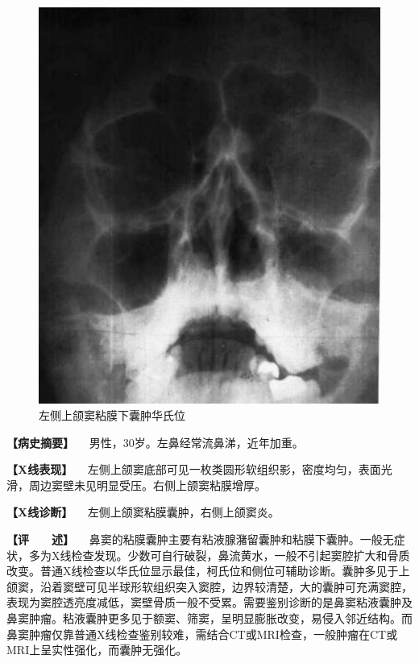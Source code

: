 \begin{figure}[!htbp]
 \centering
 \includegraphics{./images/Image00431.jpg}
 \captionsetup{justification=centering}
 \caption{左侧上颌窦粘膜下囊肿华氏位}
 \label{fig7-4-5}
  \end{figure} 

\textbf{【病史摘要】} 　男性，30岁。左鼻经常流鼻涕，近年加重。

\textbf{【X线表现】}
　左侧上颌窦底部可见一枚类圆形软组织影，密度均匀，表面光滑，周边窦壁未见明显受压。右侧上颌窦粘膜增厚。

\textbf{【X线诊断】} 　左侧上颌窦粘膜囊肿，右侧上颌窦炎。

\textbf{【评　　述】}
　鼻窦的粘膜囊肿主要有粘液腺潴留囊肿和粘膜下囊肿。一般无症状，多为X线检查发现。少数可自行破裂，鼻流黄水，一般不引起窦腔扩大和骨质改变。普通X线检查以华氏位显示最佳，柯氏位和侧位可辅助诊断。囊肿多见于上颌窦，沿着窦壁可见半球形软组织突入窦腔，边界较清楚，大的囊肿可充满窦腔，表现为窦腔透亮度减低，窦壁骨质一般不受累。需要鉴别诊断的是鼻窦粘液囊肿及鼻窦肿瘤。粘液囊肿更多见于额窦、筛窦，呈明显膨胀改变，易侵入邻近结构。而鼻窦肿瘤仅靠普通X线检查鉴别较难，需结合CT或MRI检查，一般肿瘤在CT或MRI上呈实性强化，而囊肿无强化。


